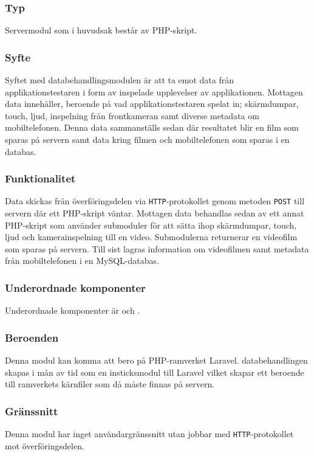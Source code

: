 \subsubsection{Typ}
Servermodul som i huvudsak består av PHP-skript.

\subsubsection{Syfte}
Syftet med databehandlingsmodulen är att ta emot data från applikationstestaren i form av inspelade upplevelser av applikationen. Mottagen data innehåller, beroende på vad applikationstestaren spelat in; skärmdumpar, touch, ljud, inspelning från frontkameran samt diverse metadata om mobiltelefonen. Denna data sammanställs sedan där resultatet blir en film som sparas på servern samt data kring filmen och mobiltelefonen som sparas i en databas.

\subsubsection{Funktionalitet}
Data skickas från överföringsdelen via \texttt{HTTP}-protokollet genom metoden \texttt{POST} till servern där ett PHP-skript väntar. Mottagen data behandlas sedan av ett annat PHP-skript som använder submoduler för att sätta ihop skärmdumpar, touch, ljud och kamerainspelning till en video. Submodulerna returnerar en videofilm som sparas på servern. Till sist lagras information om videofilmen samt metadata från mobiltelefonen i en MySQL-databas.

\subsubsection{Underordnade komponenter}
Underordnade komponenter är  och .

\subsubsection{Beroenden}
Denna modul kan komma att bero på PHP-ramverket Laravel. databehandlingen skapas i mån av tid som en insticksmodul till Laravel vilket skapar ett beroende till ramverkets kärnfiler som då måste finnas på servern.

\subsubsection{Gränssnitt}
Denna modul har inget användargränssnitt utan jobbar med \texttt{HTTP}-protokollet mot överföringsdelen.

